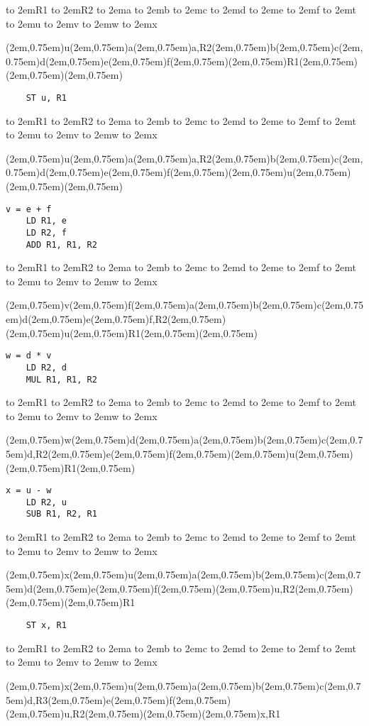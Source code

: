 \documentclass[a4paper]{article}
\newenvironment{problems}{\begin{list}{}{\renewcommand{\makelabel}[1]{\textbf{##1}\hfil}}}{\end{list}}
\def\slot#1{\framebox(2em,0.75em){#1}}
\def\lab#1{\hbox to 2em{\hfil #1 \hfil}}
\def\headingtwo{\hfill \lab{R1}\lab{R2}\hspace*{2em}\lab{a}\lab{b}\lab{c}\lab{d}\lab{e}\lab{f}\lab{t}\lab{u}\lab{v}\lab{w}\lab{x}}
\begin{document}
\begin{problems}
{\headingtwo

\hfill \slot{u}\slot{a}\hspace*{2em}\slot{a,R2}\slot{b}\slot{c}\slot{d}\slot{e}\slot{f}\slot{}\slot{R1}\slot{}\slot{}\slot{}

\begin{verbatim}
    ST u, R1
\end{verbatim}

\headingtwo

\hfill \slot{u}\slot{a}\hspace*{2em}\slot{a,R2}\slot{b}\slot{c}\slot{d}\slot{e}\slot{f}\slot{}\slot{u}\slot{}\slot{}\slot{}

\begin{verbatim}
v = e + f
    LD R1, e
    LD R2, f
    ADD R1, R1, R2
\end{verbatim}

\headingtwo

\hfill \slot{v}\slot{f}\hspace*{2em}\slot{a}\slot{b}\slot{c}\slot{d}\slot{e}\slot{f,R2}\slot{}\slot{u}\slot{R1}\slot{}\slot{}

\begin{verbatim}
w = d * v
    LD R2, d
    MUL R1, R1, R2
\end{verbatim}

\headingtwo

\hfill \slot{w}\slot{d}\hspace*{2em}\slot{a}\slot{b}\slot{c}\slot{d,R2}\slot{e}\slot{f}\slot{}\slot{u}\slot{}\slot{R1}\slot{}

\begin{verbatim}
x = u - w
    LD R2, u
    SUB R1, R2, R1
\end{verbatim}

\headingtwo

\hfill \slot{x}\slot{u}\hspace*{2em}\slot{a}\slot{b}\slot{c}\slot{d}\slot{e}\slot{f}\slot{}\slot{u,R2}\slot{}\slot{}\slot{R1}

\begin{verbatim}
    ST x, R1
\end{verbatim}

\headingtwo

\hfill \slot{x}\slot{u}\hspace*{2em}\slot{a}\slot{b}\slot{c}\slot{d,R3}\slot{e}\slot{f}\slot{}\slot{u,R2}\slot{}\slot{}\slot{x,R1}
}
\end{problems}
\end{document}

